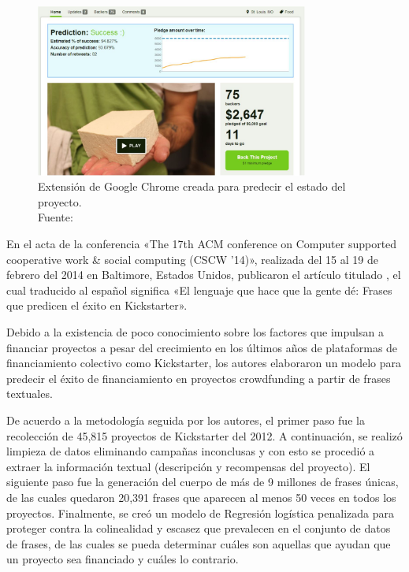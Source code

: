 \begin{figure}[!ht]
	\begin{center}
		\includegraphics[width=0.80\textwidth]{2/figures/chen2013.jpg}
		\caption[Extensión de Google Chrome creada para predecir el estado del proyecto]{Extensión de Google Chrome creada para predecir el estado del proyecto.\\
			Fuente: \cite{pr_chen2013kickpredict}}
		\label{2:fig111}
	\end{center}
\end{figure}

En el acta de la conferencia «The 17th ACM conference on Computer supported cooperative work \& social computing (CSCW '14)», realizada del 15 al 19 de febrero del 2014 en Baltimore, Estados Unidos, \cite{pr_mitra2014phrases} publicaron el artículo titulado , el cual traducido al español significa «El lenguaje que hace que la gente dé: Frases que predicen el éxito en Kickstarter».

Debido a la existencia de poco conocimiento sobre los factores que impulsan a financiar proyectos a pesar del crecimiento en los últimos años de plataformas de financiamiento colectivo como Kickstarter, los autores elaboraron un modelo para predecir el éxito de financiamiento en proyectos crowdfunding a partir de frases textuales.

De acuerdo a la metodología seguida por los autores, el primer paso fue la recolección de 45,815 proyectos de Kickstarter del 2012. A continuación, se realizó limpieza de datos eliminando campañas inconclusas y con esto se procedió a extraer la información textual (descripción y recompensas del proyecto). El siguiente paso fue la generación del cuerpo de más de 9 millones de frases únicas, de las cuales quedaron 20,391 frases que aparecen al menos 50 veces en todos los proyectos. Finalmente, se creó un modelo de Regresión logística penalizada para proteger contra la colinealidad y escasez que prevalecen en el conjunto de datos de frases, de las cuales se pueda determinar cuáles son aquellas que ayudan que un proyecto sea financiado y cuáles lo contrario.

